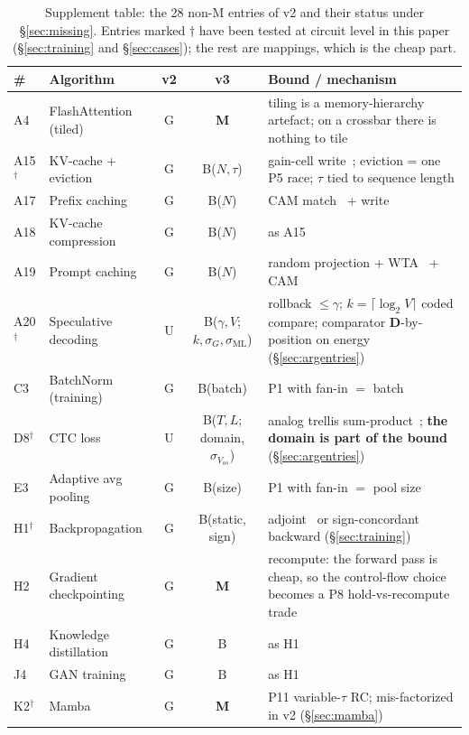 \documentclass[11pt]{article}
\begin{document}
\begin{table}[t]
\centering
\caption{Supplement table: the 28 non-M entries of v2 and their status under \S\ref{sec:missing}. Entries marked $\dagger$ have been tested at circuit level in this paper (\S\ref{sec:training} and \S\ref{sec:cases}); the rest are mappings, which is the cheap part.}
\label{tab:reclass}
\scriptsize
\begin{tabular}{llccp{6.2cm}}
\toprule
\# & Algorithm & v2 & v3 & Bound / mechanism \\
\midrule
A4 & FlashAttention (tiled) & G & \textbf{M} & tiling is a memory-hierarchy artefact; on a crossbar there is nothing to tile \\
A15$^\dagger$ & KV-cache + eviction & G & B($N,\tau$) & gain-cell write~\cite{leroux2025a}; eviction = one P5 race; $\tau$ tied to sequence length \\
A17 & Prefix caching & G & B($N$) & CAM match~\cite{li2020acam} + write \\
A18 & KV-cache compression & G & B($N$) & as A15 \\
A19 & Prompt caching & G & B($N$) & random projection + WTA~\cite{dasgupta2017} + CAM \\
A20$^\dagger$ & Speculative decoding & U & B($\gamma,V$; $k,\sigma_G,\sigma_{\mathrm{ML}}$) & rollback $\le\gamma$; $k=\lceil\log_2 V\rceil$ coded compare; comparator \textbf{D}-by-position on energy (\S\ref{sec:argentries}) \\
C3 & BatchNorm (training) & G & B(batch) & P1 with fan-in $=$ batch \\
D8$^\dagger$ & CTC loss & U & B($T,L$; domain, $\sigma_{V_{os}}$) & analog trellis sum-product~\cite{loeliger2001}; \textbf{the domain is part of the bound} (\S\ref{sec:argentries}) \\
E3 & Adaptive avg pooling & G & B(size) & P1 with fan-in $=$ pool size \\
H1$^\dagger$ & Backpropagation & G & B(static, sign) & adjoint~\cite{director1969,gokmen2016} or sign-concordant backward (\S\ref{sec:training}) \\
H2 & Gradient checkpointing & G & \textbf{M} & recompute: the forward pass is cheap, so the control-flow choice becomes a P8 hold-vs-recompute trade \\
H4 & Knowledge distillation & G & B & as H1 \\
J4 & GAN training & G & B & as H1 \\
K2$^\dagger$ & Mamba & G & \textbf{M} & P11 variable-$\tau$ RC; mis-factorized in v2 (\S\ref{sec:mamba}) \\

\end{tabular}
\end{table}
\end{document}
